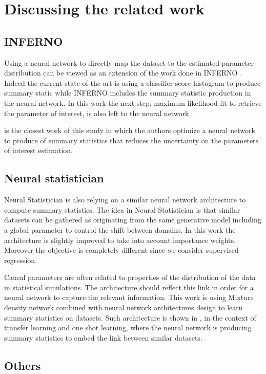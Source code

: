 \section{Discussing the related work} %
\label{sec:discussing_the_related_work}



\subsection{INFERNO} %
\label{sub:inferno}

Using a neural network to directly map the dataset to the estimated parameter distribution can be viewed as an extension of the work done in INFERNO \cite{DECASTRO2019170inferno}. 
Indeed the current state of the art is using a classifier score histogram to produce summary static while INFERNO includes the summary statistic production in the neural network.
In this work the next step, maximum likelihood fit to retrieve the parameter of interest, is also left to the neural network.


\cite{DECASTRO2019170inferno} is the closest work of this study in which the authors optimize a neural network to produce of summary statistics that reduces the uncertainty on the parameters of interest estimation.



\subsection{Neural statistician} %
\label{sub:neural_statistician}

Neural Statistician \cite{Edwards17neuralstatistician} is also relying on a similar neural network architecture to compute summary statistics.
The idea in Neural Statistician is that similar datasets can be gathered as originating from the same generative model including a global parameter to control the shift between domains.
In this work the architecture is slightly improved to take into account importance weights.
Moreover the objective is completely different since we consider supervised regression.

Causal parameters are often related to properties of the distribution of the data in statistical simulations.
The architecture should reflect this link in order for a neural network to capture the relevant information.
This work is using Mixture density network \cite{Bishop94mixturedensity} combined with neural network architectures design to learn summary statistics on datasets.
Such architecture is shown in \cite{Edwards17neuralstatistician}, in the context of transfer learning and one shot learning, where the neural network is producing summary statistics to embed the link between similar datasets.



\subsection{Others} %
\label{sub:others}


